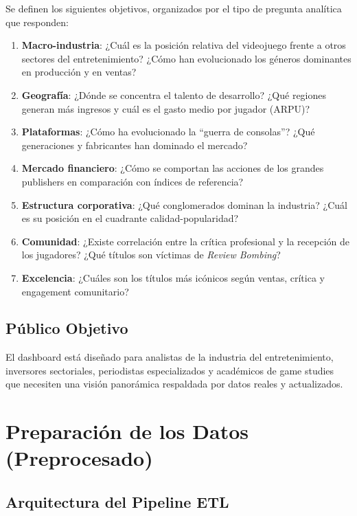 \documentclass[11pt,a4paper]{article}
\begin{document}
Se definen los siguientes objetivos, organizados por el tipo de pregunta analítica que responden:

\begin{enumerate}
  \item \textbf{Macro-industria}: ¿Cuál es la posición relativa del videojuego frente a otros sectores del entretenimiento? ¿Cómo han evolucionado los géneros dominantes en producción y en ventas?
  \item \textbf{Geografía}: ¿Dónde se concentra el talento de desarrollo? ¿Qué regiones generan más ingresos y cuál es el gasto medio por jugador (ARPU)?
  \item \textbf{Plataformas}: ¿Cómo ha evolucionado la ``guerra de consolas''? ¿Qué generaciones y fabricantes han dominado el mercado?
  \item \textbf{Mercado financiero}: ¿Cómo se comportan las acciones de los grandes publishers en comparación con índices de referencia?
  \item \textbf{Estructura corporativa}: ¿Qué conglomerados dominan la industria? ¿Cuál es su posición en el cuadrante calidad-popularidad?
  \item \textbf{Comunidad}: ¿Existe correlación entre la crítica profesional y la recepción de los jugadores? ¿Qué títulos son víctimas de \textit{Review Bombing}?
  \item \textbf{Excelencia}: ¿Cuáles son los títulos más icónicos según ventas, crítica y engagement comunitario?
\end{enumerate}

\subsection{Público Objetivo}

El dashboard está diseñado para analistas de la industria del entretenimiento, inversores sectoriales, periodistas especializados y académicos de game studies que necesiten una visión panorámica respaldada por datos reales y actualizados.


\newpage
\section{Preparación de los Datos (Preprocesado)}

\subsection{Arquitectura del Pipeline ETL}
\end{document}
